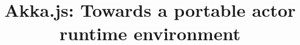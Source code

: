 \documentclass{sig-alternate}
\begin{document}
%

\title{Akka.js: Towards a portable actor runtime environment}

%
%
%
%
%
\end{document}
